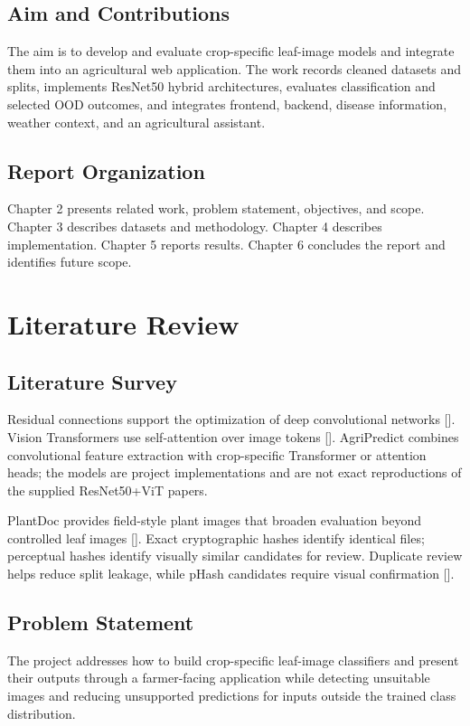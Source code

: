 \documentclass[12pt,a4paper,oneside]{report}
\begin{document}
\section{Aim and Contributions}
The aim is to develop and evaluate crop-specific leaf-image models and integrate them into an agricultural web application. The work records cleaned datasets and splits, implements ResNet50 hybrid architectures, evaluates classification and selected OOD outcomes, and integrates frontend, backend, disease information, weather context, and an agricultural assistant.
\section{Report Organization}
Chapter 2 presents related work, problem statement, objectives, and scope. Chapter 3 describes datasets and methodology. Chapter 4 describes implementation. Chapter 5 reports results. Chapter 6 concludes the report and identifies future scope.

\chapter{Literature Review}
\section{Literature Survey}
Residual connections support the optimization of deep convolutional networks [\cite{he2016}]. Vision Transformers use self-attention over image tokens [\cite{dosovitskiy2021}]. AgriPredict combines convolutional feature extraction with crop-specific Transformer or attention heads; the models are project implementations and are not exact reproductions of the supplied ResNet50+ViT papers.

PlantDoc provides field-style plant images that broaden evaluation beyond controlled leaf images [\cite{singh2020}]. Exact cryptographic hashes identify identical files; perceptual hashes identify visually similar candidates for review. Duplicate review helps reduce split leakage, while pHash candidates require visual confirmation [\cite{mckeown2023}].
\section{Problem Statement}
The project addresses how to build crop-specific leaf-image classifiers and present their outputs through a farmer-facing application while detecting unsuitable images and reducing unsupported predictions for inputs outside the trained class distribution.
\end{document}
